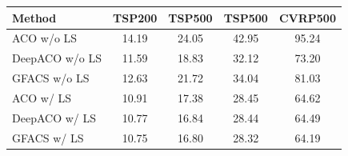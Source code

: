 \begin{tabular}{lcccc}
\toprule[1.0pt]
Method & TSP200 & TSP500 & TSP500 & CVRP500 \\
\midrule
ACO w/o LS & 14.19 & 24.05 & 42.95 & 95.24 \\
DeepACO w/o LS & 11.59 & 18.83 & 32.12 & 73.20 \\
GFACS w/o LS & 12.63 & 21.72 & 34.04 & 81.03 \\
\midrule
ACO w/ LS & 10.91 & 17.38 & 28.45 & 64.62 \\
DeepACO w/ LS & 10.77 & 16.84 & 28.44 & 64.49 \\
GFACS w/ LS & 10.75 & 16.80 & 28.32 & 64.19 \\
\bottomrule

\end{tabular}